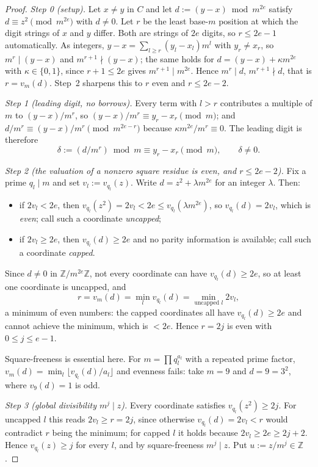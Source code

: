 \documentclass[11pt]{amsart}
\theoremstyle{plain}
\theoremstyle{remark}
\newcommand{\Z}{\mathbb{Z}}
\begin{document}
\begin{proof}
\emph{Step 0 (setup).}
Let $x \ne y$ in $C$ and let $d := (y - x) \bmod m^{2e}$ satisfy
$d \equiv z^2 \pmod{m^{2e}}$ with $d \ne 0$. Let $r$ be the least base-$m$
position at which the digit strings of $x$ and $y$ differ. Both are strings
of $2e$ digits, so $r \le 2e-1$ automatically. As integers,
$y - x = \sum_{l \ge r} (y_l - x_l) m^l$ with $y_r \ne x_r$, so
$m^r \mid (y - x)$ and $m^{r+1} \nmid (y - x)$; the same holds for
$d = (y - x) + \kappa m^{2e}$ with $\kappa \in \{0,1\}$, since
$r + 1 \le 2e$ gives $m^{r+1} \mid m^{2e}$. Hence $m^r \mid d$,
$m^{r+1} \nmid d$, that is $r = v_m(d)$. Step~2 sharpens this to $r$ even
and $r \le 2e-2$.

\emph{Step 1 (leading digit, no borrows).}
Every term with $l > r$ contributes a multiple of $m$ to $(y-x)/m^r$, so
$(y-x)/m^r \equiv y_r - x_r \pmod m$; and
$d/m^r \equiv (y-x)/m^r \pmod{m^{2e-r}}$ because
$\kappa m^{2e}/m^r \equiv 0$. The leading digit is therefore
\[
\delta := (d/m^r) \bmod m \equiv y_r - x_r \pmod m, \qquad \delta \ne 0.
\]

\emph{Step 2 (the valuation of a nonzero square residue is even, and
$r \le 2e-2$).}
Fix a prime $q_l \mid m$ and set $v_l := v_{q_l}(z)$. Write
$d = z^2 + \lambda m^{2e}$ for an integer $\lambda$. Then:
\begin{itemize}
\item if $2v_l < 2e$, then
$v_{q_l}(z^2) = 2v_l < 2e \le v_{q_l}(\lambda m^{2e})$, so
$v_{q_l}(d) = 2v_l$, which is \emph{even}; call such a coordinate
\emph{uncapped};
\item if $2v_l \ge 2e$, then $v_{q_l}(d) \ge 2e$ and no parity information
is available; call such a coordinate \emph{capped}.
\end{itemize}
Since $d \ne 0$ in $\Z/m^{2e}\Z$, not every coordinate can have
$v_{q_l}(d) \ge 2e$, so at least one coordinate is uncapped, and
\[
r = v_m(d) = \min_l v_{q_l}(d) = \min_{\text{uncapped } l} 2v_l,
\]
a minimum of even numbers: the capped coordinates all have
$v_{q_l}(d) \ge 2e$ and cannot achieve the minimum, which is $< 2e$. Hence
$r = 2j$ is even with $0 \le j \le e-1$.

Square-freeness is essential here. For $m = \prod q_l^{a_l}$ with a repeated
prime factor, $v_m(d) = \min_l \lfloor v_{q_l}(d)/a_l \rfloor$ and evenness
fails: take $m = 9$ and $d = 9 = 3^2$, where $v_9(d) = 1$ is odd.

\emph{Step 3 (global divisibility $m^j \mid z$).}
Every coordinate satisfies $v_{q_l}(z^2) \ge 2j$. For uncapped $l$ this
reads $2v_l \ge r = 2j$, since otherwise $v_{q_l}(d) = 2v_l < r$ would
contradict $r$ being the minimum; for capped $l$ it holds because
$2v_l \ge 2e \ge 2j + 2$. Hence $v_{q_l}(z) \ge j$ for every $l$, and by
square-freeness $m^j \mid z$. Put $u := z/m^j \in \Z$.


\end{proof}
\end{document}
